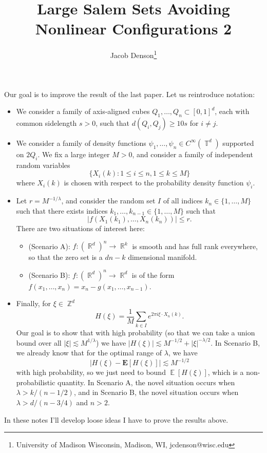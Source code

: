 \documentclass[dvipsnames,letterpaper,12pt]{article}
\title{Large Salem Sets Avoiding Nonlinear Configurations 2}
\author{Jacob Denson\footnote{University of Madison Wisconsin, Madison, WI, jcdenson@wisc.edu}}
\numberwithin{equation}{section}
\DeclareMathOperator{\RR}{\mathbb{R}}
\DeclareMathOperator{\ZZ}{\mathbb{Z}}
\DeclareMathOperator{\TT}{\mathbb{T}}
\numberwithin{theorem}{section}
\DeclareMathOperator{\EE}{\mathbb{E}}
\begin{document}
\maketitle

Our goal is to improve the result of the last paper. Let us reintroduce notation:
%
\begin{itemize}
    \item We consider a family of axis-aligned cubes $Q_1,\dots,Q_n \subset [0,1]^d$, each with common sidelength $s > 0$, such that $d(Q_i,Q_j) \geq 10s$ for $i \neq j$.

    \item We consider a family of density functions $\psi_1,\dots,\psi_n \in C^\infty(\TT^d)$ supported on $2Q_i$. We fix a large integer $M > 0$, and consider a family of independent random variables
    \[ \{ X_i(k): 1 \leq i \leq n, 1 \leq k \leq M \} \]
    where $X_i(k)$ is chosen with respect to the probability density function $\psi_i$.

    \item Let $r = M^{-1/\lambda}$, and consider the random set $I$ of all indices $k_n \in \{ 1, \dots, M \}$ such that there exists indices $k_1,\dots,k_{n-1} \in \{ 1, \dots, M \}$ such that
    \[ |f(X_1(k_1), \dots, X_n(k_n))| \leq r. \]
    There are two situations of interest here:
    \begin{itemize}
        \item (Scenario A): $f: (\RR^d)^n \to \RR^k$ is smooth and has full rank everywhere, so that the zero set is a $dn - k$ dimensional manifold.

        \item (Scenario B): $f: (\RR^d)^n \to \RR^d$ is of the form $f(x_1,\dots,x_n) = x_n - g(x_1,\dots,x_{n-1})$.
    \end{itemize}

    \item Finally, for $\xi \in \ZZ^d$
    \[ H(\xi) = \frac{1}{M} \sum_{k \in I} e^{2 \pi i \xi \cdot X_n(k)}. \]
    Our goal is to show that with high probability (so that we can take a union bound over all $|\xi| \lesssim M^{1/\lambda}$) we have $|H(\xi)| \lesssim M^{-1/2} + |\xi|^{-\lambda/2}$. In Scenario B, we already know that for the optimal range of $\lambda$, we have
    \[ |H(\xi) - \mathbf{E}[H(\xi)]| \lesssim M^{-1/2} \]
    with high probability, so we just need to bound $\EE[H(\xi)]$, which is a non-probabilistic quantity. In Scenario A, the novel situation occurs when $\lambda > k/(n-1/2)$, and in Scenario B, the novel situation occurs when $\lambda > d/(n-3/4)$ and $n > 2$.
\end{itemize}
%
In these notes I'll develop loose ideas I have to prove the results above.
\end{document}
